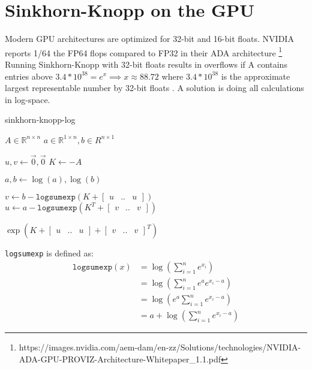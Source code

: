 \documentclass{article}
\begin{document}
\section{Sinkhorn-Knopp on the GPU}
Modern GPU architectures are optimized for 32-bit and 16-bit floats. NVIDIA reports 1/64 the FP64 flops compared to FP32 in their ADA architecture \footnote{https://images.nvidia.com/aem-dam/en-zz/Solutions/technologies/NVIDIA-ADA-GPU-PROVIZ-Architecture-Whitepaper\_1.1.pdf} Running Sinkhorn-Knopp with 32-bit floats results in overflows if A contains entries above $3.4 * 10^{38} = e^x \implies x \approx 88.72$ where $3.4 * 10^{38}$ is the approximate largest representable number by 32-bit floats \citep{ieeefloat}. A solution is doing all calculations in log-space.
\begin{algorithm}
\caption{sinkhorn-knopp-log}\label{alg:cap}
\begin{algorithmic}[1]
\Require $A \in \mathds{R}^{n \times n}$
\Require $a \in \mathds{R}^{1 \times n}, b \in R^{n \times 1}$

\State $u, v \gets \vec{0}, \vec{0}$
\State $K \gets -A$

\State $a, b \gets \log(a), \log(b)$

    \State $v \gets b - \texttt{logsumexp}(K + \begin{bmatrix} u & .. & u \end{bmatrix})$ 
    \State $u \gets a - \texttt{logsumexp}(K^T + \begin{bmatrix} v & .. & v \end{bmatrix})$ 
\EndFor

\State \Return $\exp(K + \begin{bmatrix} u & .. & u \end{bmatrix} + \begin{bmatrix} v & .. & v \end{bmatrix}^T)$

\end{algorithmic}
\end{algorithm}

\texttt{logsumexp} is defined as:
\begin{align*}
    \texttt{logsumexp}(x) &= \log(\sum_{i = 1}^n e^{x_i})\\ &= \log(\sum_{i = 1}^n e^a e^{x_i - a})\\ &= \log(e^a \sum_{i = 1}^ne^{x_i - a})\\ &= a +\log(\sum_{i = 1}^ne^{x_i - a})
\end{align*}
\end{document}
